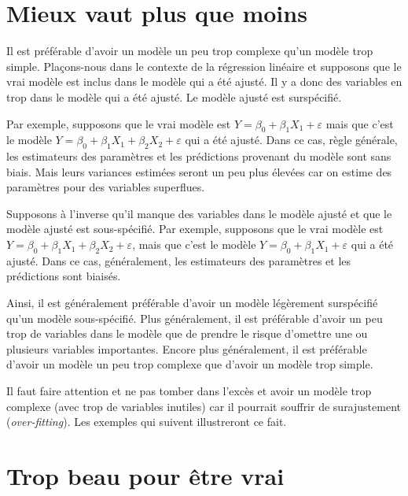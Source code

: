 \documentclass[
  11pt,
  letterpaper,
]{book}
\theoremstyle{definition}
\theoremstyle{definition}
\theoremstyle{definition}
\theoremstyle{remark}
\begin{document}
\hypertarget{mieux-vaut-plus-que-moins}{%
\section{Mieux vaut plus que moins}\label{mieux-vaut-plus-que-moins}}

Il est préférable d'avoir un modèle un peu trop complexe qu'un modèle trop simple. Plaçons-nous dans le contexte de la régression linéaire et supposons que le vrai modèle est inclus dans le modèle qui a été ajusté. Il y a donc des variables en trop dans le modèle qui a été ajusté. Le modèle ajusté est surspécifié.

Par exemple, supposons que le vrai modèle est \(Y=\beta_0+\beta_1X_1+\varepsilon\) mais que c'est le modèle \(Y=\beta_0+\beta_1X_1+\beta_2X_2+\varepsilon\) qui a été ajusté. Dans ce cas, règle générale, les estimateurs des paramètres et les prédictions provenant du modèle sont sans biais. Mais leurs variances estimées seront un peu plus élevées car on estime des paramètres pour des variables superflues.

Supposons à l'inverse qu'il manque des variables dans le modèle ajusté et que le modèle ajusté est sous-spécifié. Par exemple, supposons que le vrai modèle est \(Y=\beta_0+\beta_1X_1+\beta_2X_2+\varepsilon\), mais que c'est le modèle \(Y=\beta_0+\beta_1X_1+\varepsilon\) qui a été ajusté. Dans ce cas, généralement, les estimateurs des paramètres et les prédictions sont biaisés.

Ainsi, il est généralement préférable d'avoir un modèle légèrement surspécifié qu'un modèle sous-spécifié. Plus généralement, il est préférable d'avoir un peu trop de variables dans le modèle que de prendre le risque d'omettre une ou plusieurs variables importantes. Encore plus généralement, il est préférable d'avoir un modèle un peu trop complexe que d'avoir un modèle trop simple.

Il faut faire attention et ne pas tomber dans l'excès et avoir un modèle trop complexe (avec trop de variables inutiles) car il pourrait souffrir de surajustement (\emph{over-fitting}). Les exemples qui suivent illustreront ce fait.

\hypertarget{trop-beau-pour-uxeatre-vrai}{%
\section{Trop beau pour être vrai}\label{trop-beau-pour-uxeatre-vrai}}
\end{document}
